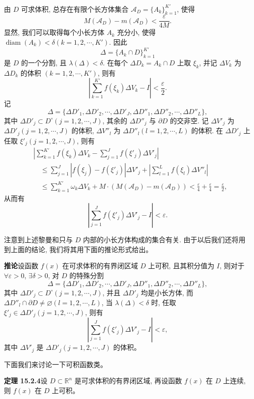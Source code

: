 \documentclass[UTF8, 12pt, fontset=fandol, oneside]{ctexart}
\begin{document}
由 $D$ 可求体积, 总存在有限个长方体集合 $\mathcal A_D=\{A_k\}_{k=1}^{K'}$, 使得
\[
  M(\mathcal A_D)-m(\mathcal A_D)<\frac{\varepsilon}{4M}.
\]
显然, 我们可以取得每个小长方体 $A_k$ 充分小, 使得 $\operatorname{diam}(A_k)<\delta(k=1,2,\cdots,K')$. 因此
\[
  \Delta=\{A_k\cap D\}_{k=1}^{K'}
\]
是 $D$ 的一个分割, 且 $\lambda(\Delta)<\delta$. 在每个 $\Delta D_k=A_k\cap D$ 上取 $\xi_k$, 并记 $\Delta V_k$ 为 $\Delta D_k$ 的体积 $(k=1,2,\cdots,K')$, 则有
\[
  \left|\sum_{k=1}^{K'} f(\xi_k)\Delta V_k-I\right|<\frac{\varepsilon}{2}.
\]
记
\[
  \Delta=\{\Delta D'_1,\Delta D'_2,\cdots,\Delta D'_J,\Delta D''_1,\Delta D''_2,\cdots,\Delta D''_L\},
\]
其中 $\Delta D'_j\subset D^\circ(j=1,2,\cdots,J)$, 其余的 $\Delta D''_j$ 与 $\partial D$ 的交非空. 记 $\Delta V'_j$ 为 $\Delta D'_j(j=1,2,\cdots,J)$ 的体积, $\Delta V''_l$ 为 $\Delta D''_l(l=1,2,\cdots,L)$ 的体积. 在 $\Delta D'_j$ 上任取 $\xi'_j(j=1,2,\cdots,J)$, 则有
\[
\begin{aligned}
  &\left|\sum_{k=1}^{K'}f(\xi_k)\Delta V_k-\sum_{j=1}^J f(\xi'_j)\Delta V'_j\right|\\
  &\quad\leqslant
  \sum_{j=1}^J|f(\xi_j)-f(\xi'_j)|\Delta V'_j+
  \left|\sum_{l=1}^L f(\xi_l)\Delta V''_l\right|\\
  &\quad\leqslant
  \sum_{k=1}^{K'}\omega_k\Delta V_k+M\cdot(M(\mathcal A_D)-m(\mathcal A_D))
  <\frac{\varepsilon}{4}+\frac{\varepsilon}{4}=\frac{\varepsilon}{2},
\end{aligned}
\]
从而有
\[
  \left|\sum_{j=1}^J f(\xi'_j)\Delta V'_j-I\right|<\varepsilon.
\]

注意到上述黎曼和只与 $D$ 内部的小长方体构成的集合有关. 由于以后我们还将用到上面的结论, 我们将其用下面的推论形式给出。

\noindent\textbf{推论}\quad 设函数 $f(x)$ 在可求体积的有界闭区域 $D$ 上可积, 且其积分值为 $I$, 则对于 $\forall\varepsilon>0$, $\exists\delta>0$, 对 $D$ 的特殊分割
\[
  \Delta=\{\Delta D'_1,\Delta D'_2,\cdots,\Delta D'_J,\Delta D''_1,\Delta D''_2,\cdots,\Delta D''_L\},
\]
其中 $\Delta D'_j\subset D^\circ(j=1,2,\cdots,J)$, 并且 $\Delta D'_j$ 均是小长方体, 而 $\Delta D''_l\cap\partial D\ne\varnothing(l=1,2,\cdots,L)$, 当 $\lambda(\Delta)<\delta$ 时, 任取 $\xi'_j\in\Delta D'_j(j=1,2,\cdots,J)$, 则有
\[
  \left|\sum_{j=1}^J f(\xi'_j)\Delta V'_j-I\right|<\varepsilon,
\]
其中 $\Delta V'_j$ 是 $\Delta D'_j(j=1,2,\cdots,J)$ 的体积。

下面我们来讨论一下可积函数类。

\noindent\textbf{定理 15.2.4}\quad 设 $D\subset\mathbb R^n$ 是可求体积的有界闭区域, 再设函数 $f(x)$ 在 $D$ 上连续, 则 $f(x)$ 在 $D$ 上可积。
\end{document}
